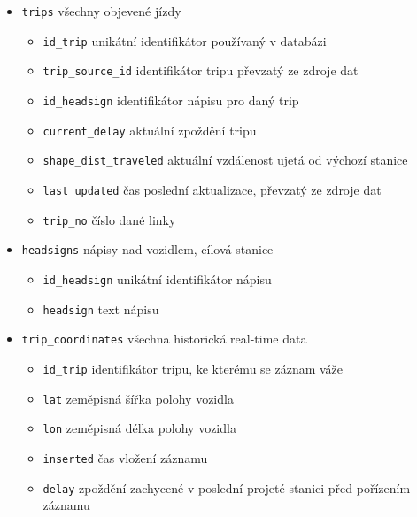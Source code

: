 \begin{itemize}
\item \verb-trips- všechny objevené jízdy


\begin{itemize}
\item \verb-id_trip- unikátní identifikátor používaný v databázi


\item \verb-trip_source_id- identifikátor tripu převzatý ze zdroje dat


\item \verb-id_headsign- identifikátor nápisu pro daný trip


\item \verb-current_delay- aktuální zpoždění tripu


\item \verb-shape_dist_traveled- aktuální vzdálenost ujetá od výchozí stanice


\item \verb-last_updated- čas poslední aktualizace, převzatý ze zdroje dat


\item \verb-trip_no- číslo dané linky
\end{itemize}


\item \verb-headsigns- nápisy nad vozidlem, cílová stanice


\begin{itemize}
\item \verb-id_headsign- unikátní identifikátor nápisu


\item \verb-headsign- text nápisu
\end{itemize}


\item \verb-trip_coordinates- všechna historická real-time data


\begin{itemize}
\item \verb-id_trip- identifikátor tripu, ke kterému se záznam váže


\item \verb-lat- zeměpisná šířka polohy vozidla


\item \verb-lon- zeměpisná délka polohy vozidla


\item \verb-inserted- čas vložení záznamu


\item \verb-delay- zpoždění zachycené v poslední projeté stanici před pořízením záznamu



\end{itemize}
\end{itemize}
